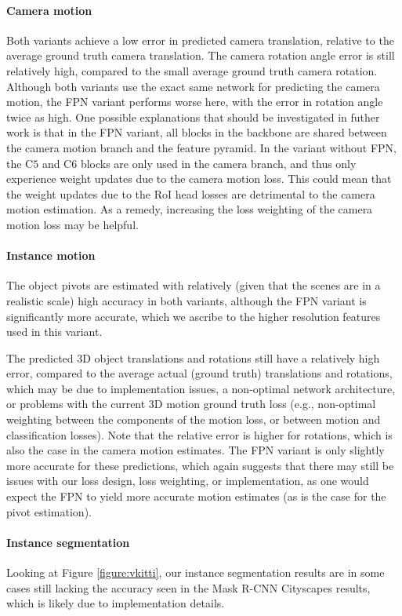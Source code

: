 \paragraph{Camera motion}
Both variants achieve a low error in predicted camera translation, relative to
the average ground truth camera translation. The camera rotation angle error
is still relatively high, compared to the small average ground truth camera rotation.
Although both variants use the exact same network for predicting the camera motion,
the FPN variant performs worse here, with the error in rotation angle twice as high.
One possible explanations that should be investigated in futher work is
that in the FPN variant, all blocks in the backbone are shared between the camera
motion branch and the feature pyramid. In the variant without FPN, the C$5$ and
C$6$ blocks are only used in the camera branch, and thus only experience weight
updates due to the camera motion loss. This could mean that the weight updates due
to the RoI head losses are detrimental to the camera motion estimation.
As a remedy, increasing the loss weighting of the camera motion loss may be
helpful.

\paragraph{Instance motion}
The object pivots are estimated with relatively (given that the scenes are in a realistic scale)
high accuracy in both variants, although the FPN variant is significantly more
accurate, which we ascribe to the higher resolution features used in this variant.

The predicted 3D object translations and rotations still have a relatively high
error, compared to the average actual (ground truth) translations and rotations,
which may be due to implementation issues, a non-optimal network architecture,
or problems with the current 3D motion ground truth loss
(e.g., non-optimal weighting between the components of the motion loss, or between motion and classification losses).
Note that the relative error is higher for rotations, which is
also the case in the camera motion estimates.
The FPN variant is only slightly more accurate for these predictions, which again suggests
that there may still be issues with our loss design, loss weighting, or implementation, as one would expect the
FPN to yield more accurate motion estimates (as is the case for the pivot estimation).

\paragraph{Instance segmentation}
Looking at Figure \ref{figure:vkitti}, our instance segmentation results are in
some cases still lacking the accuracy seen in the Mask R-CNN Cityscapes \cite{MaskRCNN} results,
which is likely due to implementation details.
